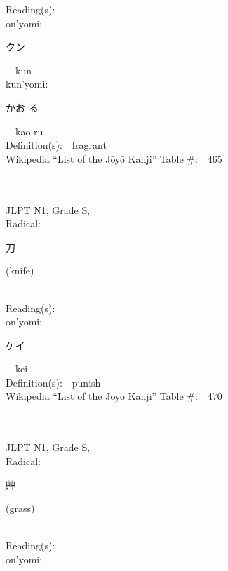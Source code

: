 \begin{multicols}{2}
Reading(s):\ \ \\
{\hspace*{1em}}on'yomi:\ \ \\
{\hspace*{2em}}{\begin{CJK}{UTF8}{min} クン \end{CJK}}\ \ kun\ \ \\
{\hspace*{1em}}kun'yomi:\ \ \\
{\hspace*{2em}}{\begin{CJK}{UTF8}{min} かお-る \end{CJK}}\ \ kao-ru\ \ \\
Definition(s):\ \ fragrant \\
Wikipedia ``List of the J\=oy\=o Kanji'' Table \#:\ \ 465 \\
\ \ \\
{\fontsize{34pt}{40pt}  }\ \ \\
{JLPT N1, Grade S, \\Radical:\ \ {\begin{CJK}{UTF8}{min} 刀 \end{CJK}} (knife) } \\
Reading(s):\ \ \\
{\hspace*{1em}}on'yomi:\ \ \\
{\hspace*{2em}}{\begin{CJK}{UTF8}{min} ケイ \end{CJK}}\ \ kei\ \ \\
Definition(s):\ \ punish \\
Wikipedia ``List of the J\=oy\=o Kanji'' Table \#:\ \ 470 \\
\ \ \\
{\fontsize{34pt}{40pt}  }\ \ \\
{JLPT N1, Grade S, \\Radical:\ \ {\begin{CJK}{UTF8}{min} 艸 \end{CJK}} (grass) } \\
Reading(s):\ \ \\
{\hspace*{1em}}on'yomi:\ \ \\

\end{multicols}
